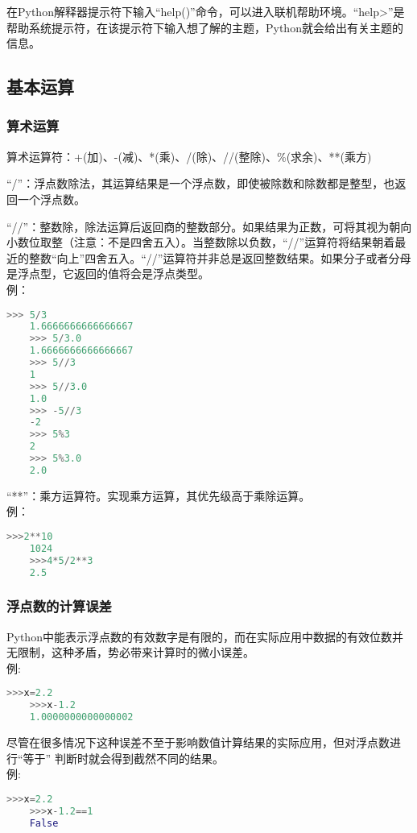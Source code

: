 \documentclass[11pt,a4paper]{article}
\begin{document}
在Python解释器提示符下输入“help()”命令，可以进入联机帮助环境。“help>”是帮助系统提示符，在该提示符下输入想了解的主题，Python就会给出有关主题的信息。

\subsection{基本运算}

\subsubsection{算术运算}

算术运算符：+(加)、-(减)、*(乘)、/(除)、//(整除)、\%(求余)、**(乘方)

“/”：浮点数除法，其运算结果是一个浮点数，即使被除数和除数都是整型，也返回一个浮点数。

“//”：整数除，除法运算后返回商的整数部分。如果结果为正数，可将其视为朝向小数位取整（注意：不是四舍五入）。当整数除以负数，“//”运算符将结果朝着最近的整数“向上”四舍五入。“//”运算符并非总是返回整数结果。如果分子或者分母是浮点型，它返回的值将会是浮点类型。\\
例：
\begin{lstlisting}[language={Python}]
    >>> 5/3
    1.6666666666666667
    >>> 5/3.0
    1.6666666666666667
    >>> 5//3
    1
    >>> 5//3.0
    1.0
    >>> -5//3
    -2
    >>> 5%3
    2
    >>> 5%3.0
    2.0
\end{lstlisting}

“**”：乘方运算符。实现乘方运算，其优先级高于乘除运算。\\
例：
\begin{lstlisting}[language={Python}]
    >>>2**10
    1024
    >>>4*5/2**3
    2.5
\end{lstlisting}

\subsubsection{浮点数的计算误差}

Python中能表示浮点数的有效数字是有限的，而在实际应用中数据的有效位数并无限制，这种矛盾，势必带来计算时的微小误差。\\
例:
\begin{lstlisting}[language={Python}]
    >>>x=2.2
    >>>x-1.2
    1.0000000000000002
\end{lstlisting}

尽管在很多情况下这种误差不至于影响数值计算结果的实际应用，但对浮点数进行“等于” 判断时就会得到截然不同的结果。\\
例:
\begin{lstlisting}[language={Python}]
    >>>x=2.2
    >>>x-1.2==1
    False
\end{lstlisting}
\end{document}

